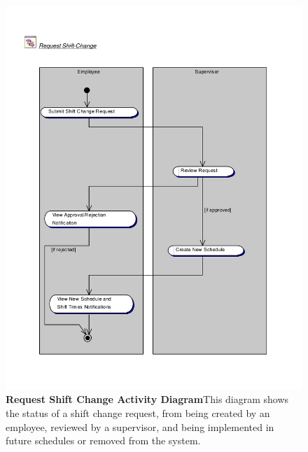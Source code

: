 \documentclass[letterpaper,12pt]{report}
\begin{document}
\begin{figure}[activity_reqshiftchng]
 \centering
 \includegraphics[scale=0.8,trim=20mm 20mm 25mm 0mm]{diagrams/swimreq.pdf}
 \caption{\small
\textbf{Request Shift Change Activity Diagram}\newline This diagram shows the status of a shift change request, from being created by an employee, reviewed by a supervisor, and being implemented in future schedules or removed from the system. }\label{fig:act3}
\end{figure}
\newpage
\end{document}
